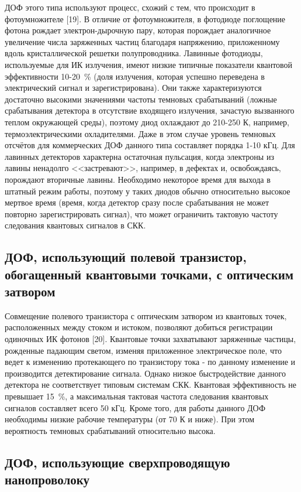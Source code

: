 ДОФ этого типа используют процесс, схожий с тем, что происходит в фотоумножителе [19]. В отличие от фотоумножителя, в фотодиоде поглощение фотона рождает электрон-дырочную пару, которая порождает аналогичное увеличение числа заряженных частиц благодаря напряжению, приложенному вдоль кристаллической решетки полупроводника. Лавинные фотодиоды, используемые для ИК излучения, имеют низкие типичные показатели квантовой эффективности 10-20~\%  (доля излучения, которая успешно переведена в электрический сигнал и зарегистрирована). Они также характеризуются достаточно высокими значениями частоты темновых срабатываний (ложные срабатывания детектора в отсутствие входящего излучения, зачастую вызванного теплом окружающей среды), поэтому диод охлаждают до 210-250 К, например, термоэлектрическими охладителями. Даже в этом случае уровень темновых отсчётов для коммерческих ДОФ данного типа составляет порядка 1-10 кГц. Для лавинных детекторов характерна остаточная пульсация, когда электроны из лавины ненадолго <<застревают>>, например, в дефектах и, освобождаясь, порождают вторичные лавины. Необходимо некоторое время для выхода в штатный режим работы, поэтому у таких диодов обычно относительно высокое мертвое время (время, когда детектор сразу после срабатывания не может повторно зарегистрировать сигнал), что может ограничить тактовую частоту следования квантовых сигналов в СКК.

\subsection{ДОФ, использующий полевой транзистор, обогащенный квантовыми точками, с оптическим затвором} \label{subsec:ch1/sec5/sub2}

Совмещение полевого транзистора с оптическим затвором из квантовых точек, расположенных между стоком и истоком, позволяют добиться регистрации одиночных ИК фотонов [20]. Квантовые точки захватывают заряженные частицы, рожденные падающим светом, изменяя приложенное электрическое поле, что ведет к изменению протекающего по транзистору тока - по данному изменение и производится детектирование сигнала. Однако низкое быстродействие данного детектора не соответствует типовым системам СКК. Квантовая эффективность не превышает 15~\%, а максимальная тактовая частота следования квантовых сигналов составляет всего 50 кГц. Кроме того, для работы данного ДОФ необходимы низкие рабочие температуры (от 70 К и ниже). При этом вероятность темновых срабатываний относительно высока.

\subsection{ДОФ, использующие сверхпроводящую нанопроволоку} \label{subsec:ch1/sec5/sub3}

